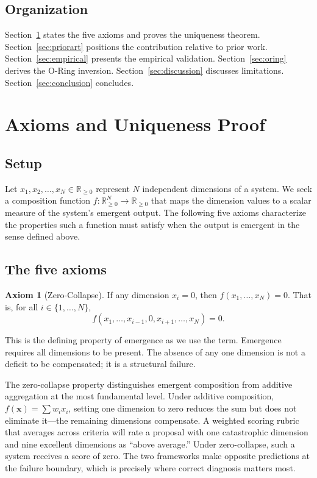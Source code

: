 \documentclass[12pt, a4paper]{article}
\theoremstyle{definition}
\newtheorem{axiom}{Axiom}
\theoremstyle{remark}
\newcommand{\Rnn}{\mathbb{R}_{\geq 0}}
\begin{document}
\subsection{Organization}

Section~\ref{sec:axioms} states the five axioms and proves the uniqueness theorem. Section~\ref{sec:priorart} positions the contribution relative to prior work. Section~\ref{sec:empirical} presents the empirical validation. Section~\ref{sec:oring} derives the O-Ring inversion. Section~\ref{sec:discussion} discusses limitations. Section~\ref{sec:conclusion} concludes.


\section{Axioms and Uniqueness Proof}\label{sec:axioms}

\subsection{Setup}

Let $x_1, x_2, \ldots, x_N \in \Rnn$ represent $N$ independent dimensions of a system. We seek a composition function $f: \Rnn^N \to \Rnn$ that maps the dimension values to a scalar measure of the system's emergent output. The following five axioms characterize the properties such a function must satisfy when the output is emergent in the sense defined above.

\subsection{The five axioms}

\begin{axiom}[Zero-Collapse]\label{ax:zero}
If any dimension $x_i = 0$, then $f(x_1, \ldots, x_N) = 0$. That is, for all $i \in \{1, \ldots, N\}$,
\[
f(x_1, \ldots, x_{i-1}, 0, x_{i+1}, \ldots, x_N) = 0.
\]
\end{axiom}

\noindent This is the defining property of emergence as we use the term. Emergence requires all dimensions to be present. The absence of any one dimension is not a deficit to be compensated; it is a structural failure.

The zero-collapse property distinguishes emergent composition from additive aggregation at the most fundamental level. Under additive composition, $f(\mathbf{x}) = \sum w_i x_i$, setting one dimension to zero reduces the sum but does not eliminate it---the remaining dimensions compensate. A weighted scoring rubric that averages across criteria will rate a proposal with one catastrophic dimension and nine excellent dimensions as ``above average.'' Under zero-collapse, such a system receives a score of zero. The two frameworks make opposite predictions at the failure boundary, which is precisely where correct diagnosis matters most.
\end{document}
